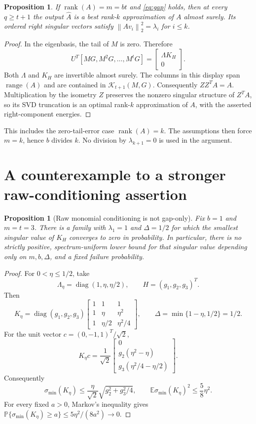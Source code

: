 \documentclass[11pt]{article}
\newtheorem{proposition}[theorem]{Proposition}
\theoremstyle{definition}
\newcommand{\Prob}{\mathbb P}
\newcommand{\E}{\mathbb E}
\newcommand{\diag}{\operatorname{diag}}
\newcommand{\range}{\operatorname{range}}
\newcommand{\rank}{\operatorname{rank}}
\newcommand{\K}{\mathcal K}
\newcommand{\norm}[1]{\left\lVert #1\right\rVert}
\begin{document}
\begin{proposition}
\label{prop:rankexact}
If $\rank(A)=m=bt$ and \eqref{eq:gap} holds, then at every $q\geq t+1$
the output $\widehat A$ is a best rank-$k$ approximation of $A$ almost
surely. Its ordered right singular vectors satisfy
$\norm{Av_i}_2^2=\lambda_i$ for $i\leq k$.
\end{proposition}
\begin{proof}
In the eigenbasis, the tail of $M$ is zero. Therefore
\[
 U^T[MG,M^2G,\ldots,M^tG]
 =\begin{bmatrix}\Lambda K_H\\0\end{bmatrix}.
\]
Both $\Lambda$ and $K_H$ are invertible almost surely. The columns in this
display span $\range(A)$ and are contained in $\K_{t+1}(M,G)$.
Consequently $ZZ^TA=A$. Multiplication by the isometry $Z$ preserves the
nonzero singular structure of $Z^TA$, so its SVD truncation is an optimal
rank-$k$ approximation of $A$, with the asserted right-component energies.
\end{proof}

This includes the zero-tail-error case $\rank(A)=k$. The assumptions then
force $m=k$, hence $b$ divides $k$. No division by $\lambda_{k+1}=0$ is used
in the argument.

\section{A counterexample to a stronger raw-conditioning assertion}
\label{sec:raw}

\begin{proposition}[Raw monomial conditioning is not gap-only]
\label{prop:raw}
Fix $b=1$ and $m=t=3$. There is a family with $\lambda_1=1$ and
$\Delta=1/2$ for which the smallest singular value of $K_H$ converges to
zero in probability. In particular, there is no strictly positive,
spectrum-uniform lower bound for that singular value depending only on
$m,b,\Delta$, and a fixed failure probability.
\end{proposition}
\begin{proof}
For $0<\eta\leq1/2$, take
\[
 \Lambda_\eta=\diag(1,\eta,\eta/2),\qquad
 H=(g_1,g_2,g_3)^T.
\]
Then
\[
 K_\eta=\diag(g_1,g_2,g_3)
 \begin{bmatrix}
 1&1&1\\
 1&\eta&\eta^2\\
 1&\eta/2&\eta^2/4
 \end{bmatrix},\qquad
 \Delta=\min\{1-\eta,1/2\}=1/2.
\]
For the unit vector $c=(0,-1,1)^T/\sqrt2$,
\[
 K_\eta c=\frac1{\sqrt2}
 \begin{bmatrix}
 0\\g_2(\eta^2-\eta)\\g_3(\eta^2/4-\eta/2)
 \end{bmatrix}.
\]
Consequently
\begin{equation}
 \sigma_{\min}(K_\eta)
 \leq\frac\eta{\sqrt2}\sqrt{g_2^2+g_3^2/4},\qquad
 \E\sigma_{\min}(K_\eta)^2\leq\frac58\eta^2.
 \label{eq:raw-bound}
\end{equation}
For every fixed $a>0$, Markov's inequality gives
$\Prob\{\sigma_{\min}(K_\eta)\geq a\}\leq5\eta^2/(8a^2)\to0$.
\end{proof}
\end{document}
